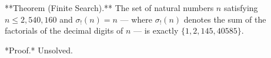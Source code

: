 
**Theorem (Finite Search).** The set of natural numbers $n$ satisfying $n \leq 2{,}540{,}160$ and $\sigma_!(n) = n$ — where $\sigma_!(n)$ denotes the sum of the factorials of the decimal digits of $n$ — is exactly $\{1, 2, 145, 40585\}$.

*Proof.* Unsolved.
